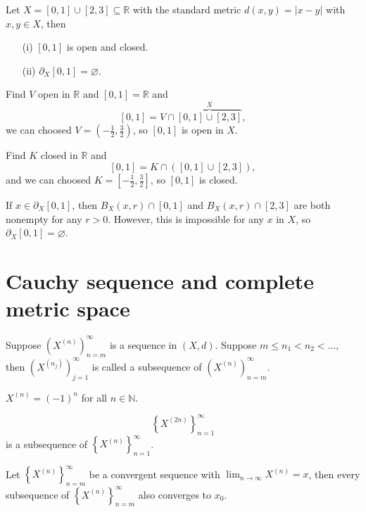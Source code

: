 \begin{eg}
    Let \(X = [0, 1] \cup [2, 3] \subseteq \mathbb{R} \) with the standard metric \(d(x,y) = \vert x-y \vert \) with \(x,y \in X\), then 
    \begin{itemize}
        \item [(i)] \([0, 1]\) is open and closed. 
        \item [(ii)] \(\partial _X [0, 1] = \varnothing \).  
    \end{itemize}  
\end{eg}
\begin{explanation}
    Find \(V\) open in \(\mathbb{R} \) and \([0, 1] = \mathbb{R} \) and 
    \[
        [0, 1] = V \cap \overbrace{[0, 1] \cup [2, 3]}^{X},
    \]  we can choosed \(V = \left( -\frac{1}{2}, \frac{3}{2} \right) \), so \([0, 1]\) is open in \(X\). 
    
    Find \(K\) closed in \(\mathbb{R} \) and 
    \[
        [0, 1] = K \cap \left( [0, 1] \cup [2, 3] \right),
    \]and we can choosed \(K = \left[ -\frac{1}{2}, \frac{3}{2}\right] \), so \([0, 1]\) is closed.  

    If \(x \in \partial _X [0, 1]\), then \(B_X(x, r) \cap [0, 1]\) and \(B_X(x, r) \cap [2, 3]\) are both nonempty for any \(r>0\). However, this is impossible for any \(x\) in \(X\), so \(\partial _X[0, 1] = \varnothing \).       
\end{explanation}
\section{Cauchy sequence and complete metric space}
\begin{definition}[subsequence]
    Suppose \(\left( X^{(n)} \right)_{n=m}^{\infty}  \) is a sequence in \((X, d)\). Suppose \(m \le n_1 < n_2 < \dots \), then \(\left( X^{(n_j)} \right)_{j=1}^{\infty}  \) is called a subsequence of \(\left( X^{(n)} \right)_{n=m}^{\infty}  \).   
\end{definition}

\begin{eg}
    \(X^{(n)} = (-1)^n\) for all \(n \in \mathbb{N} \).  
\end{eg}
\begin{explanation}
    \[
        \left\{ X^{(2n)} \right\}_{n=1}^{\infty } 
    \]is a subsequence of \(\left\{ X^{(n)} \right\}_{n=1}^{\infty}  \). 
\end{explanation}

\begin{lemma}
    Let \(\left\{ X^{(n)} \right\}_{n=m}^{\infty}  \) be a convergent sequence with \(\lim_{n \to \infty} X^{(n)} = x \), then every subsequence of \(\left\{ X^{(n)} \right\}_{n=m}^{\infty}  \) also converges to \(x_0\).    
\end{lemma}

